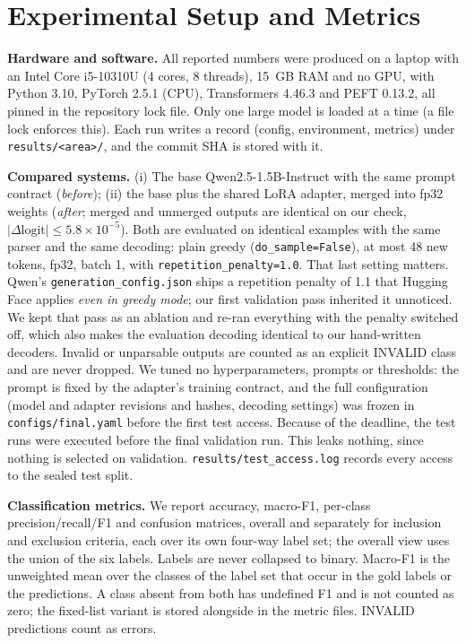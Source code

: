 \section{Experimental Setup and Metrics}
\label{sec:setup}
\textbf{Hardware and software.} All reported numbers were produced on a laptop with an Intel Core i5-10310U (4 cores, 8 threads), 15~GB RAM and no GPU, with Python 3.10, PyTorch 2.5.1 (CPU), Transformers 4.46.3 and PEFT 0.13.2, all pinned in the repository lock file. Only one large model is loaded at a time (a file lock enforces this). Each run writes a record (config, environment, metrics) under \texttt{results/<area>/}, and the commit SHA is stored with it.

\textbf{Compared systems.} (i) The base Qwen2.5-1.5B-Instruct with the same prompt contract (\emph{before}); (ii) the base plus the shared LoRA adapter, merged into fp32 weights (\emph{after}; merged and unmerged outputs are identical on our check, $|\Delta\text{logit}|\le5.8\times10^{-5}$). Both are evaluated on identical examples with the same parser and the same decoding: plain greedy (\texttt{do\_sample=False}), at most 48 new tokens, fp32, batch 1, with \texttt{repetition\_penalty=1.0}. That last setting matters. Qwen's \texttt{generation\_config.json} ships a repetition penalty of 1.1 that Hugging Face applies \emph{even in greedy mode}; our first validation pass inherited it unnoticed. We kept that pass as an ablation and re-ran everything with the penalty switched off, which also makes the evaluation decoding identical to our hand-written decoders. Invalid or unparsable outputs are counted as an explicit INVALID class and are never dropped. We tuned no hyperparameters, prompts or thresholds: the prompt is fixed by the adapter's training contract, and the full configuration (model and adapter revisions and hashes, decoding settings) was frozen in \texttt{configs/final.yaml} before the first test access. Because of the deadline, the test runs were executed before the final validation run. This leaks nothing, since nothing is selected on validation. \texttt{results/test\_access.log} records every access to the sealed test split.

\textbf{Classification metrics.} We report accuracy, macro-F1, per-class precision/recall/F1 and confusion matrices, overall and separately for inclusion and exclusion criteria, each over its own four-way label set; the overall view uses the union of the six labels. Labels are never collapsed to binary. Macro-F1 is the unweighted mean over the classes of the label set that occur in the gold labels or the predictions. A class absent from both has undefined F1 and is not counted as zero; the fixed-list variant is stored alongside in the metric files. INVALID predictions count as errors.

